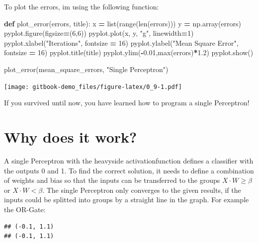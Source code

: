 \documentclass[
]{book}
\newenvironment{Shaded}{\begin{snugshade}}{\end{snugshade}}
\newcommand{\BuiltInTok}[1]{#1}
\newcommand{\DecValTok}[1]{\textcolor[rgb]{0.00,0.00,0.81}{#1}}
\newcommand{\FloatTok}[1]{\textcolor[rgb]{0.00,0.00,0.81}{#1}}
\newcommand{\KeywordTok}[1]{\textcolor[rgb]{0.13,0.29,0.53}{\textbf{#1}}}
\newcommand{\NormalTok}[1]{#1}
\newcommand{\OperatorTok}[1]{\textcolor[rgb]{0.81,0.36,0.00}{\textbf{#1}}}
\newcommand{\StringTok}[1]{\textcolor[rgb]{0.31,0.60,0.02}{#1}}
\begin{document}
To plot the errors, im using the following function:

\begin{Shaded}
\begin{Highlighting}[]
\KeywordTok{def}\NormalTok{ plot\_error(errors, title):}
\NormalTok{  x }\OperatorTok{=} \BuiltInTok{list}\NormalTok{(}\BuiltInTok{range}\NormalTok{(}\BuiltInTok{len}\NormalTok{(errors)))}
\NormalTok{  y }\OperatorTok{=}\NormalTok{ np.array(errors)}
\NormalTok{  pyplot.figure(figsize}\OperatorTok{=}\NormalTok{(}\DecValTok{6}\NormalTok{,}\DecValTok{6}\NormalTok{))}
\NormalTok{  pyplot.plot(x, y, }\StringTok{"g"}\NormalTok{, linewidth}\OperatorTok{=}\DecValTok{1}\NormalTok{)}
\NormalTok{  pyplot.xlabel(}\StringTok{"Iterations"}\NormalTok{, fontsize }\OperatorTok{=} \DecValTok{16}\NormalTok{)}
\NormalTok{  pyplot.ylabel(}\StringTok{"Mean Square Error"}\NormalTok{, fontsize }\OperatorTok{=} \DecValTok{16}\NormalTok{)}
\NormalTok{  pyplot.title(title)}
\NormalTok{  pyplot.ylim(}\OperatorTok{{-}}\FloatTok{0.01}\NormalTok{,}\BuiltInTok{max}\NormalTok{(errors)}\OperatorTok{*}\FloatTok{1.2}\NormalTok{)}
\NormalTok{  pyplot.show()}
  
  
\NormalTok{plot\_error(mean\_square\_errors, }\StringTok{"Single Perceptron"}\NormalTok{)}
\end{Highlighting}
\end{Shaded}

\texttt{[image: gitbook-demo\_files/figure-latex/0\_9-1.pdf]}

If you survived until now, you have learned how to program a single Perceptron!

\hypertarget{why-does-it-work}{%
\section{Why does it work?}\label{why-does-it-work}}

A single Perceptron with the heavyside activationfunction defines a classifier with the outputs 0 and 1. To find the correct solution, it needs to define a combination of weights and bias so that the inputs can be transferred to the groups \(X \cdot W \geq \beta\) or \(X \cdot W < \beta\). The single Perceptron only converges to the given results, if the inputs could be splitted into groups by a straight line in the graph. For example the OR-Gate:

\begin{verbatim}
## (-0.1, 1.1)
## (-0.1, 1.1)
\end{verbatim}
\end{document}
